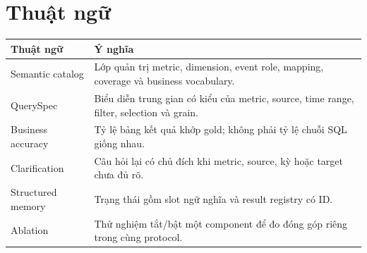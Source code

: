 \documentclass[11pt,a4paper]{article}
\begin{document}
\section{Thuật ngữ}
\begin{longtable}{p{3.5cm}p{11cm}}\toprule Thuật ngữ & Ý nghĩa\\\midrule Semantic catalog & Lớp quản trị metric, dimension, event role, mapping, coverage và business vocabulary.\\ QuerySpec & Biểu diễn trung gian có kiểu của metric, source, time range, filter, selection và grain.\\ Business accuracy & Tỷ lệ bảng kết quả khớp gold; không phải tỷ lệ chuỗi SQL giống nhau.\\ Clarification & Câu hỏi lại có chủ đích khi metric, source, kỳ hoặc target chưa đủ rõ.\\ Structured memory & Trạng thái gồm slot ngữ nghĩa và result registry có ID.\\ Ablation & Thử nghiệm tắt/bật một component để đo đóng góp riêng trong cùng protocol.\\\bottomrule\end{longtable}
\printbibliography
\end{document}
